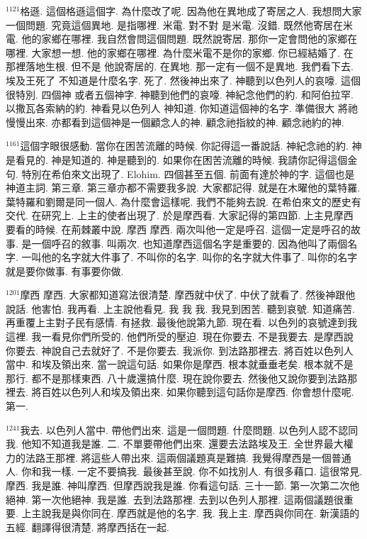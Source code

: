 \documentclass{book}
\begin{document}
$^{1121}$格遜.
這個格遜這個字.
為什麼改了呢.
因為他在異地成了寄居之人.
我想問大家一個問題.
究竟這個異地.
是指哪裡.
米電.
對不對 是米電.
沒錯.
既然他寄居在米電.
他的家鄉在哪裡.
我自然會問這個問題.
既然說寄居.
那你一定會問他的家鄉在哪裡.
大家想一想.
他的家鄉在哪裡.
為什麼米電不是你的家鄉.
你已經結婚了.
在那裡落地生根.
但不是 他說寄居的.
在異地.
那一定有一個不是異地.
我們看下去.
埃及王死了 不知道是什麼名字.
死了.
然後神出來了.
神聽到以色列人的哀嚎.
這個很特別.
四個神 或者五個神字.
神聽到他們的哀嚎.
神紀念他們的約.
和阿伯拉罕.
以撒瓦各索納的約.
神看見以色列人 神知道.
你知道這個神的名字.
準備很大 將祂慢慢出來.
亦都看到這個神是一個顧念人的神.
顧念祂指紋的神.
顧念祂約的神.

$^{1161}$這個字眼很感動.
當你在困苦流離的時候.
你記得這一番說話.
神紀念祂的約.
神是看見的.
神是知道的.
神是聽到的.
如果你在困苦流離的時候.
我請你記得這個金句.
特別在希伯來文出現了.
Elohim.
四個甚至五個.
前面有達於神的字.
這個也是神道主詞.
第三章.
第三章亦都不需要我多說.
大家都記得.
就是在木曜他的葉特羅.
葉特羅和劉爾是同一個人.
為什麼會這樣呢.
我們不能夠去說.
在希伯來文的歷史有交代.
在研究上.
上主的使者出現了.
於是摩西看.
大家記得的第四節.
上主見摩西要看的時候.
在荊棘叢中說.
摩西 摩西.
兩次叫他一定是呼召.
這個一定是呼召的故事.
是一個呼召的敘事.
叫兩次.
也知道摩西這個名字是重要的.
因為他叫了兩個名字.
一叫他的名字就大件事了.
不叫你的名字.
叫你的名字就大件事了.
叫你的名字就是要你做事.
有事要你做.

$^{1201}$摩西 摩西.
大家都知道寫法很清楚.
摩西就中伏了.
中伏了就看了.
然後神跟他說話.
他害怕.
我再看.
上主說他看見.
我 我 我.
我見到困苦.
聽到哀號.
知道痛苦.
再重覆上主對子民有感情.
有拯救.
最後他說第九節.
現在看.
以色列的哀號達到我這裡.
我一看見你們所受的.
他們所受的壓迫.
現在你要去.
不是我要去.
是摩西說你要去.
神說自己去就好了.
不是你要去.
我派你.
到法路那裡去.
將百姓以色列人當中.
和埃及領出來.
當一說這句話.
如果你是摩西.
根本就垂垂老矣.
根本就不是那行.
都不是那樣東西.
八十歲還搞什麼.
現在說你要去.
然後他又說你要到法路那裡去.
將百姓以色列人和埃及領出來.
如果你聽到這句話你是摩西.
你會想什麼呢.
第一.

$^{1241}$我去.
以色列人當中.
帶他們出來.
這是一個問題.
什麼問題.
以色列人認不認同我.
他知不知道我是誰.
二.
不單要帶他們出來.
還要去法路埃及王.
全世界最大權力的法路王那裡.
將這些人帶出來.
這兩個議題真是難搞.
我覺得摩西是一個普通人.
你和我一樣.
一定不要搞我.
最後甚至說.
你不如找別人.
有很多藉口.
這很常見.
摩西.
我是誰.
神叫摩西.
但摩西說我是誰.
你看這句話.
三十一節.
第一次第二次他絕神.
第一次他絕神.
我是誰.
去到法路那裡.
去到以色列人那裡.
這兩個議題很重要.
上主說我是與你同在.
摩西就是他的名字.
我.
我上主.
摩西與你同在.
新漢語的五經.
翻譯得很清楚.
將摩西括在一起.
\end{document}
